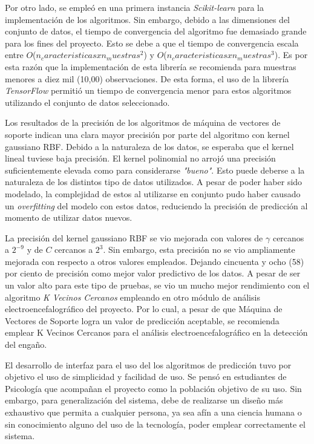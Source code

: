 Por otro lado, se empleó en una primera instancia \textit{Scikit-learn} para la implementación de los algoritmos. Sin embargo, debido a las dimensiones del conjunto de datos, el tiempo de convergencia del algoritmo fue demasiado grande para los fines del proyecto. Esto se debe a que el tiempo de convergencia escala entre $O$($n_caracteristicas x n_muestras^2$) y $O$($n_caracteristicas x n_muestras^3$). Es por esta razón que la implementación de esta librería se recomienda para muestras menores a diez mil (10,00) observaciones. De esta forma, el uso de la librería \textit{TensorFlow} permitió un tiempo de convergencia menor para estos algoritmos utilizando el conjunto de datos seleccionado. 

Los resultados de la precisión de los algoritmos de máquina de vectores de soporte indican una clara mayor precisión por parte del algoritmo con kernel gaussiano RBF. Debido a la naturaleza de los datos, se esperaba que el kernel lineal tuviese baja precisión. El kernel polinomial no arrojó una precisión suficientemente elevada como para considerarse \textit{"bueno"}. Esto puede deberse a la naturaleza de los distintos tipo de datos utilizados. A pesar de poder haber sido modelado, la complejidad de estos al utilizarse en conjunto pudo haber causado un \textit{overfitting} del modelo con estos datos, reduciendo la precisión de predicción al momento de utilizar datos nuevos.

La precisión del kernel gaussiano RBF se vio mejorada con valores de $\gamma$ cercanos a $2^{-9}$ y de $C$ cercanos a $2^{3}$. Sin embargo, esta precisión no se vio ampliamente mejorada con respecto a otros valores empleados. Dejando cincuenta y ocho (58) por ciento de precisión como mejor valor predictivo de los datos. A pesar de ser un valor alto para este tipo de pruebas, se vio un mucho mejor rendimiento con el algoritmo \textit{K Vecinos Cercanos} empleando en otro módulo de análisis electroencefalográfico del proyecto. Por lo cual, a pesar de que Máquina de Vectores de Soporte logra un valor de predicción aceptable, se recomienda emplear K Vecinos Cercanos para el análisis electroencefalográfico en la detección del engaño.

El desarrollo de interfaz para el uso del los algoritmos de predicción tuvo por objetivo el uso de simplicidad y facilidad de uso. Se pensó en estudiantes de Psicología que acompañan el proyecto como la población objetivo de su uso. Sin embargo, para generalización del sistema, debe de realizarse un diseño más exhaustivo que permita a cualquier persona, ya sea afín a una ciencia humana o sin conocimiento alguno del uso de la tecnología, poder emplear correctamente el sistema. 

